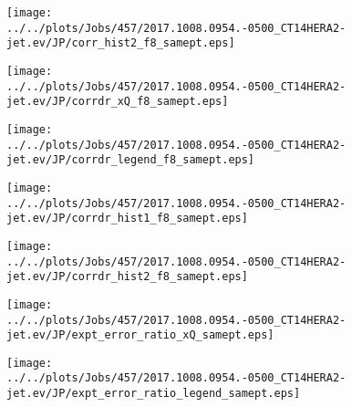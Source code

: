 \documentclass[12pt]{article}
\begin{document}
\begin{figure}
\texttt{[image: ../../plots/Jobs/457/2017.1008.0954.-0500\_CT14HERA2-jet.ev/JP/corr\_hist2\_f8\_samept.eps]}
\caption{}
\end{figure}\newpage\clearpage
\begin{figure}
\texttt{[image: ../../plots/Jobs/457/2017.1008.0954.-0500\_CT14HERA2-jet.ev/JP/corrdr\_xQ\_f8\_samept.eps]}
\caption{}
\end{figure}\newpage\clearpage
\begin{figure}
\texttt{[image: ../../plots/Jobs/457/2017.1008.0954.-0500\_CT14HERA2-jet.ev/JP/corrdr\_legend\_f8\_samept.eps]}
\caption{}
\end{figure}\newpage\clearpage
\begin{figure}
\texttt{[image: ../../plots/Jobs/457/2017.1008.0954.-0500\_CT14HERA2-jet.ev/JP/corrdr\_hist1\_f8\_samept.eps]}
\caption{}
\end{figure}\newpage\clearpage
\begin{figure}
\texttt{[image: ../../plots/Jobs/457/2017.1008.0954.-0500\_CT14HERA2-jet.ev/JP/corrdr\_hist2\_f8\_samept.eps]}
\caption{}
\end{figure}\newpage\clearpage
\begin{figure}
\texttt{[image: ../../plots/Jobs/457/2017.1008.0954.-0500\_CT14HERA2-jet.ev/JP/expt\_error\_ratio\_xQ\_samept.eps]}
\caption{}
\end{figure}\newpage\clearpage
\begin{figure}
\texttt{[image: ../../plots/Jobs/457/2017.1008.0954.-0500\_CT14HERA2-jet.ev/JP/expt\_error\_ratio\_legend\_samept.eps]}
\caption{}
\end{figure}\newpage\clearpage
\end{document}
